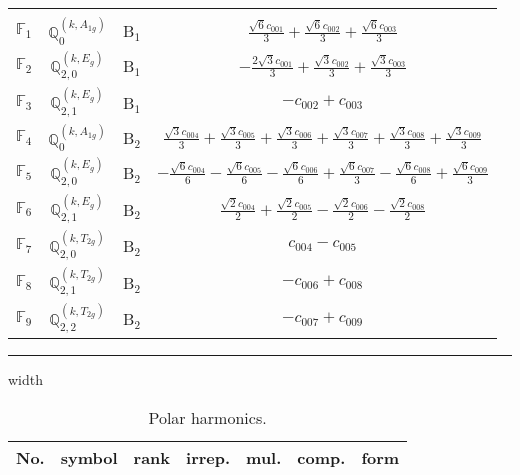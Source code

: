 \documentclass[fleqn,10pt,landscape]{article}
\begin{document}
\begin{itemize}
\begin{center}
\begin{longtable}{c|c|c|c}
 \hline \hline
\multicolumn{3}{r}{} \\ \endlastfoot

$ \mathbb{F}_{1} $ & $\mathbb{Q}_{0}^{(k,A_{1g})}$ & B$_{1}$ & $\frac{\sqrt{6} c_{001}}{3} + \frac{\sqrt{6} c_{002}}{3} + \frac{\sqrt{6} c_{003}}{3}$ \\
$ \mathbb{F}_{2} $ & $\mathbb{Q}_{2,0}^{(k,E_{g})}$ & B$_{1}$ & $- \frac{2 \sqrt{3} c_{001}}{3} + \frac{\sqrt{3} c_{002}}{3} + \frac{\sqrt{3} c_{003}}{3}$ \\
$ \mathbb{F}_{3} $ & $\mathbb{Q}_{2,1}^{(k,E_{g})}$ & B$_{1}$ & $- c_{002} + c_{003}$ \\ \hline
$ \mathbb{F}_{4} $ & $\mathbb{Q}_{0}^{(k,A_{1g})}$ & B$_{2}$ & $\frac{\sqrt{3} c_{004}}{3} + \frac{\sqrt{3} c_{005}}{3} + \frac{\sqrt{3} c_{006}}{3} + \frac{\sqrt{3} c_{007}}{3} + \frac{\sqrt{3} c_{008}}{3} + \frac{\sqrt{3} c_{009}}{3}$ \\
$ \mathbb{F}_{5} $ & $\mathbb{Q}_{2,0}^{(k,E_{g})}$ & B$_{2}$ & $- \frac{\sqrt{6} c_{004}}{6} - \frac{\sqrt{6} c_{005}}{6} - \frac{\sqrt{6} c_{006}}{6} + \frac{\sqrt{6} c_{007}}{3} - \frac{\sqrt{6} c_{008}}{6} + \frac{\sqrt{6} c_{009}}{3}$ \\
$ \mathbb{F}_{6} $ & $\mathbb{Q}_{2,1}^{(k,E_{g})}$ & B$_{2}$ & $\frac{\sqrt{2} c_{004}}{2} + \frac{\sqrt{2} c_{005}}{2} - \frac{\sqrt{2} c_{006}}{2} - \frac{\sqrt{2} c_{008}}{2}$ \\
$ \mathbb{F}_{7} $ & $\mathbb{Q}_{2,0}^{(k,T_{2g})}$ & B$_{2}$ & $c_{004} - c_{005}$ \\
$ \mathbb{F}_{8} $ & $\mathbb{Q}_{2,1}^{(k,T_{2g})}$ & B$_{2}$ & $- c_{006} + c_{008}$ \\
$ \mathbb{F}_{9} $ & $\mathbb{Q}_{2,2}^{(k,T_{2g})}$ & B$_{2}$ & $- c_{007} + c_{009}$ \\
\end{longtable}
\end{center}

 \hfil \hrule height 1mm width \textwidth \hfil

\begin{center}
\renewcommand{\arraystretch}{1.3}
\begin{longtable}{ccccccc}
\caption{Polar harmonics.}
 \\
 \hline \hline
No. & symbol & rank & irrep. & mul. & comp. & form \\ \hline \endfirsthead


\end{longtable}
\end{center}
\end{itemize}
\end{document}
